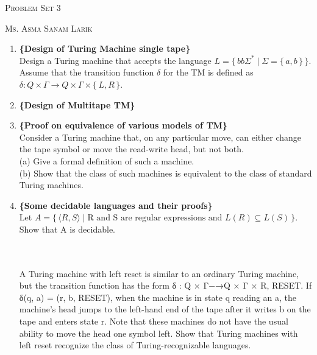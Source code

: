 \documentclass[11pt, article, oneside]{memoir}
\newcommand{\set}[1]{\{\, #1\, \}}
\begin{document}
\begin{center}
\LARGE{\textsc{Problem Set 3}}
 
\large{\textsc{Ms. Asma Sanam Larik}}
\end{center}


\begin{enumerate}
    \item
    \textbf{\{Design of Turing Machine single tape\}}
    \\Design a Turing machine that accepts the language \(L = \set{ bb\Sigma^* \mid \Sigma = \set{a, b}}\). Assume that the transition function \( \delta \) for the TM is defined as \( \delta : Q \times \Gamma \rightarrow Q \times \Gamma \times \set{L,R}\).

    \item
    \textbf{\{Design of Multitape TM\}}

    \item
    \textbf{\{Proof on equivalence of various models of TM\}}
    \\Consider a Turing machine that, on any particular move, can either change the tape symbol or move the read-write head, but not both.
    \\(a) Give a formal definition of such a machine.
    \\(b) Show that the class of such machines is equivalent to the class of standard Turing machines.

    \item
    \textbf{\{Some decidable languages and their proofs\}}
    \\Let \(A = \set{\langle R, S\rangle \mid \text{R and S are regular expressions and }L(R) \subseteq L(S)}\). Show that A is decidable.

    \\
    \\A Turing machine with left reset is similar to an ordinary Turing machine, but the
transition function has the form
δ : Q × Γ−→Q × Γ × {R, RESET}.
If δ(q, a) = (r, b, RESET), when the machine is in state q reading an a, the machine’s head jumps to the left-hand end of the tape after it writes b on the tape and
enters state r. Note that these machines do not have the usual ability to move the
head one symbol left. Show that Turing machines with left reset recognize the class
of Turing-recognizable languages.



\end{enumerate}
\end{document}
